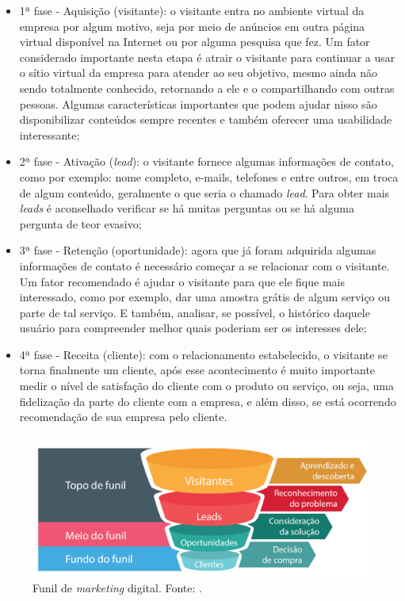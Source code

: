 \begin{itemize}
    \item 1ª fase - Aquisição (visitante): o visitante entra no ambiente virtual da empresa por algum motivo, seja por meio de anúncios em outra página virtual disponível na Internet ou por alguma pesquisa que fez. Um fator considerado importante nesta etapa é atrair o visitante para continuar a usar o sítio virtual da empresa para atender ao seu objetivo, mesmo ainda não sendo totalmente conhecido, retornando a ele e o compartilhando com outras pessoas. Algumas características importantes que podem ajudar nisso são disponibilizar conteúdos sempre recentes e também oferecer uma usabilidade interessante;
    
    \item 2ª fase - Ativação (\textit{lead}): o visitante fornece algumas informações de contato, como por exemplo: nome completo, e-mails, telefones e entre outros, em troca de algum conteúdo, geralmente o que seria o chamado \textit{lead}. Para obter mais \textit{leads} é aconselhado verificar se há muitas perguntas ou se há alguma pergunta de teor evasivo;
    
    \item 3ª fase - Retenção (oportunidade): agora que já foram adquirida algumas informações de contato é necessário começar a se relacionar com o visitante. Um fator recomendado é ajudar o visitante para que ele fique mais interessado, como por exemplo, dar uma amostra grátis de algum serviço ou parte de tal serviço. E também, analisar, se possível, o histórico daquele usuário para compreender melhor quais poderiam ser os interesses dele;
    
    \item 4ª fase - Receita (cliente): com o relacionamento estabelecido, o visitante se torna finalmente um cliente, após esse acontecimento é muito importante medir o nível de satisfação do cliente com o produto ou serviço, ou seja, uma fidelização da parte do cliente com a empresa, e além disso, se está ocorrendo recomendação de sua empresa pelo cliente.

\end{itemize}

\begin{figure}[H]
    \centering
    \includegraphics[scale=0.2]{figuras/referencial_teorico/funil_marketing.png}
    \caption[Funil de \textit{marketing} digital]{Funil de \textit{marketing} digital. Fonte: \cite{INSIDEOUT:2018}.}
    \label{fig:funil_marketing}
\end{figure}

